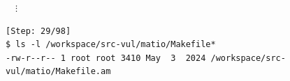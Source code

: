 \begin{tcolorbox}[enhanced,title={Example of compiling the project and constructing PoCs with Python}]
\vspace{-\baselineskip}
$\quad\vdots$
\vspace{-.5\baselineskip}
\begin{verbatim}
[Step: 29/98]
$ ls -l /workspace/src-vul/matio/Makefile*
-rw-r--r-- 1 root root 3410 May  3  2024 /workspace/src-vul/matio/Makefile.am
\end{verbatim}

\end{tcolorbox}
